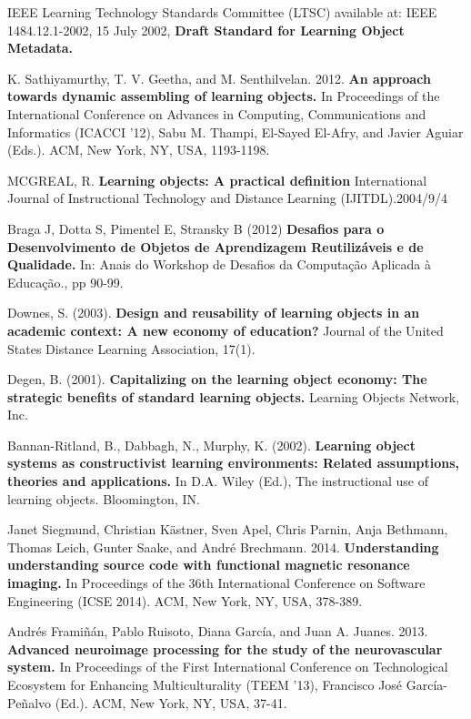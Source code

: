 \documentclass[12pt,openright,oneside,a4paper,english,french,spanish,brazil]{unifil}
\begin{document}
\begin{thebibliography}{99}

{IEEE Learning Technology Standards Committee (LTSC) available at: IEEE 1484.12.1-2002, 15 July 2002, \textbf{Draft Standard for Learning Object Metadata.}}

{K. Sathiyamurthy, T. V. Geetha, and M. Senthilvelan. 2012. \textbf{An approach towards dynamic assembling of learning objects.} In Proceedings of the International Conference on Advances in Computing, Communications and Informatics (ICACCI '12), Sabu M. Thampi, El-Sayed El-Afry, and Javier Aguiar (Eds.). ACM, New York, NY, USA, 1193-1198.}

{MCGREAL, R. \textbf{Learning objects: A practical definition} International Journal of Instructional Technology and Distance Learning (IJITDL).2004/9/4}

{Braga J, Dotta S, Pimentel E, Stransky B (2012) \textbf{Desafios para o
Desenvolvimento de Objetos de Aprendizagem Reutilizáveis e de Qualidade.} In: Anais do Workshop de Desafios da Computação Aplicada à Educação., pp 90-99.}

{Downes, S. (2003). \textbf{Design and reusability of learning objects in an academic context: A new economy of education?} Journal of the United States Distance Learning Association, 17(1).}

{Degen, B. (2001). \textbf{Capitalizing on the learning object economy: The strategic benefits of standard learning objects.} Learning Objects Network, Inc.}

{Bannan-Ritland, B., Dabbagh, N., Murphy, K. (2002). \textbf{Learning object systems as constructivist learning environments: Related assumptions, theories and applications.} In D.A. Wiley (Ed.), The instructional
use of learning objects. Bloomington, IN.}

{Janet Siegmund, Christian Kästner, Sven Apel, Chris Parnin, Anja Bethmann, Thomas Leich, Gunter Saake, and André Brechmann. 2014. \textbf{Understanding understanding source code with functional magnetic resonance imaging.} In Proceedings of the 36th International Conference on Software Engineering (ICSE 2014). ACM, New York, NY, USA, 378-389.}

{Andrés Framiñán, Pablo Ruisoto, Diana García, and Juan A. Juanes. 2013. \textbf{Advanced neuroimage processing for the study of the neurovascular system.} In Proceedings of the First International Conference on Technological Ecosystem for Enhancing Multiculturality (TEEM '13), Francisco José García-Peñalvo (Ed.). ACM, New York, NY, USA, 37-41.}

\end{thebibliography}
\end{document}
